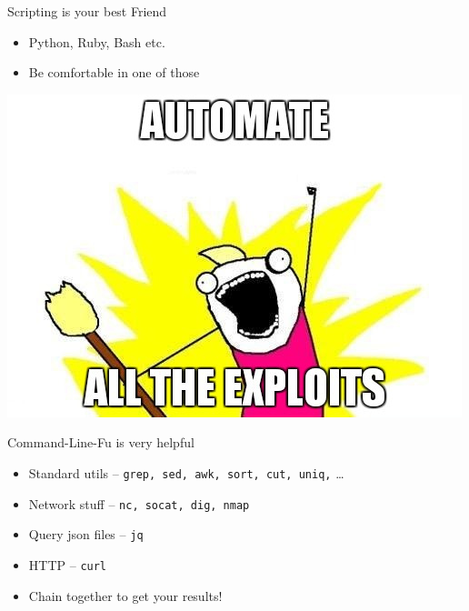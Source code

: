 \begin{frame}
  {Scripting is your best Friend}

  \begin{itemize}
    \item Python, Ruby, Bash etc.
    \item Be comfortable in one of those
  \end{itemize}

  \begin{center}
    \includegraphics[height=0.5\textheight]{images/automatealltheexploits.jpg}
  \end{center}
\end{frame}


\begin{frame}
  {Command-Line-Fu is very helpful}

  \begin{itemize}
    \item Standard utils -- \texttt{grep, sed, awk, sort, cut, uniq,} \ldots
    \item Network stuff -- \texttt{nc, socat, dig, nmap}
    \item Query json files -- \texttt{jq}
    \item HTTP -- \texttt{curl}
  \end{itemize}

  \begin{itemize}
    \item Chain together to get your results!
  \end{itemize}
\end{frame}


\begin{frame}



\end{frame}


